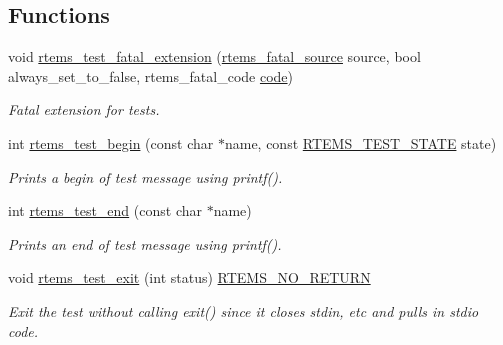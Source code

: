 \subsection*{Functions}
\begin{DoxyCompactItemize}
\item 
\mbox{\label{group__RTEMSTest_ga79fcd10b018b0b8499b54a25d88f990b}} 
void \mbox{\hyperlink{group__RTEMSTest_ga79fcd10b018b0b8499b54a25d88f990b}{rtems\+\_\+test\+\_\+fatal\+\_\+extension}} (\mbox{\hyperlink{group__RTEMSScoreIntErr_ga878b4de77df7d0b83d19609d4de42c26}{rtems\+\_\+fatal\+\_\+source}} source, bool always\+\_\+set\+\_\+to\+\_\+false, rtems\+\_\+fatal\+\_\+code \mbox{\hyperlink{structcode}{code}})
\begin{DoxyCompactList}\small\item\em Fatal extension for tests. \end{DoxyCompactList}\item 
int \mbox{\hyperlink{group__RTEMSTest_gaf651d0e7e25a5761afa106ca407b9b68}{rtems\+\_\+test\+\_\+begin}} (const char $\ast$name, const \mbox{\hyperlink{group__RTEMSTest_gab272ab809e3df25459e5cb8a66762e52}{R\+T\+E\+M\+S\+\_\+\+T\+E\+S\+T\+\_\+\+S\+T\+A\+TE}} state)
\begin{DoxyCompactList}\small\item\em Prints a begin of test message using printf(). \end{DoxyCompactList}\item 
int \mbox{\hyperlink{group__RTEMSTest_gafeae3b6d6cf174a0e91d6347be9cd211}{rtems\+\_\+test\+\_\+end}} (const char $\ast$name)
\begin{DoxyCompactList}\small\item\em Prints an end of test message using printf(). \end{DoxyCompactList}\item 
\mbox{\label{group__RTEMSTest_ga9ff57a71a4d38d69d121a2d69a15359a}} 
void \mbox{\hyperlink{group__RTEMSTest_ga9ff57a71a4d38d69d121a2d69a15359a}{rtems\+\_\+test\+\_\+exit}} (int status) \mbox{\hyperlink{group__RTEMSScoreBaseDefs_gaa2f0ed67aa174f684bb31b7e8bdb386f}{R\+T\+E\+M\+S\+\_\+\+N\+O\+\_\+\+R\+E\+T\+U\+RN}}
\begin{DoxyCompactList}\small\item\em Exit the test without calling exit() since it closes stdin, etc and pulls in stdio code. \end{DoxyCompactList}\item 

\end{DoxyCompactItemize}
